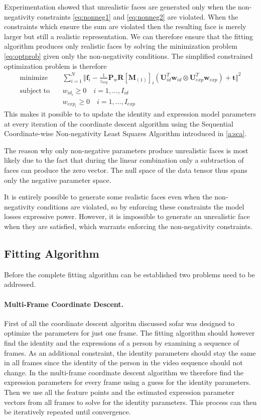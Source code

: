 \documentclass[11pt,a4paper]{report}
\begin{document}
Experimentation showed that unrealistic faces are generated only when the
non-negativity constraints \ref{eq:nonneg1} and \ref{eq:nonneg2} are
violated. When the constraints which ensure the sum are violated then the
resulting face is merely larger but still a realistic representation. We can therefore ensure that the fitting algorithm produces only
realistic faces by solving the minimization problem \ref{eq:optprob} given only the non-negativity
conditions. The simplified constrained optimization problem is therefore  
\begin{align}
\mathrm{minimize}\quad &\sum_{i=1}^N \Big\Vert\mathbf{f}_i - \frac{1}{z_{avg}}\mathbf{P}_w\mathbf{R}[\mathbf{M}_{(1)}]_{i}(\mathbf{U}_{id}^T\mathbf{w}_{id} \otimes
\mathbf{U}_{exp}^T\mathbf{w}_{exp}) + \mathbf{t}\Big\Vert^2\\
\mathrm{subject\; to}\quad &w_{id_i} \ge 0 \quad i=1,\ldots ,I_{id}\\\
&w_{exp_i} \ge 0 \quad i=1,\ldots ,I_{exp}
\end{align}
This makes it possible to to update the identity and
expression model parameters at every iteration of the coordinate descent
algorithm using the Sequential Coordinate-wise Non-negativity
Least Squares Algorithm introduced in \ref{a:sca}. 

The reason why only non-negative parameters produce unrealistic faces is most
likely due to the fact that during the linear combination only a subtraction of
faces can produce the zero vector. The null space of the data tensor thus spans only the negative
parameter space. 

It is entirely possible to generate some realistic
faces even when the non-negativity conditions are violated, so by enforcing
these constraints the model losses expressive power. However, it is
impossible to generate an unrealistic face when they are satisfied, which
warrants enforcing the non-negativity constraints.

\subsection{Fitting Algorithm}
Before the complete fitting algorithm can be established two problems need to be
addressed. 

\paragraph{Multi-Frame Coordinate Descent.} First of all the coordinate descent algoritm discussed sofar was
designed to optimize the parameters for just one frame. The fitting algorithm
should however find the identity and the expressions of a person by examining a
sequence of frames. As an additional constraint, the identity parameters should
stay the same in all frames since the identity of the person in the video
sequence should not change. In the multi-frame coordinate descent algorithm we therefore find the expression
parameters for every frame using a guess for the identity parameters. Then we
use all the feature points and the estimated expression parameter vectors from all frames
to solve for the identity parameters. This process can then be iteratively
repeated until convergence.
\end{document}
